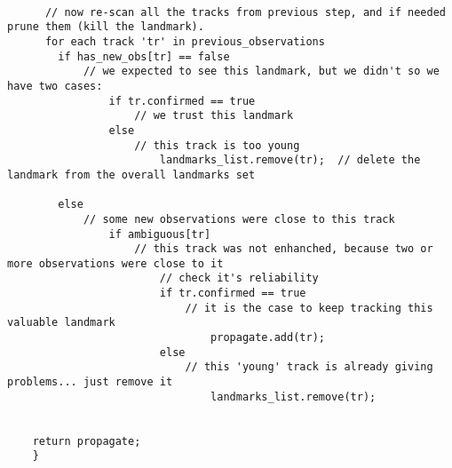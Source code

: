 {\begin{lstlisting}[frame=shadowbox,breaklines]
      
      // now re-scan all the tracks from previous step, and if needed prune them (kill the landmark).
      for each track 'tr' in previous_observations
      	if has_new_obs[tr] == false
        	// we expected to see this landmark, but we didn't so we have two cases:
                if tr.confirmed == true
                	// we trust this landmark
                else
                	// this track is too young
                        landmarks_list.remove(tr);	// delete the landmark from the overall landmarks set
        
        else
        	// some new observations were close to this track
                if ambiguous[tr]
                	// this track was not enhanched, because two or more observations were close to it
                        // check it's reliability
                        if tr.confirmed == true
                        	// it is the case to keep tracking this valuable landmark
                                propagate.add(tr);
                        else
                        	// this 'young' track is already giving problems... just remove it
                                landmarks_list.remove(tr);
                
      
    return propagate;
    }
  \end{lstlisting}
}
